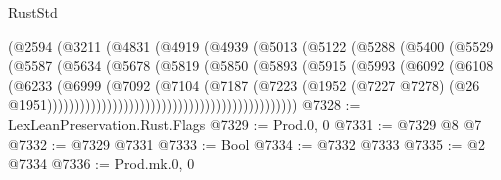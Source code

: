 \begin{lexlean}{RustStd}
\begin{coremodule}
                                        (@2594
                                          (@3211
                                            (@4831
                                              (@4919
                                                (@4939
                                                  (@5013
                                                    (@5122
                                                      (@5288
                                                        (@5400
                                                          (@5529
                                                            (@5587
                                                              (@5634
                                                                (@5678
                                                                  (@5819
                                                                    (@5850
                                                                      (@5893
                                                                        (@5915
                                                                          (@5993
                                                                            (@6092
                                                                              (@6108
                                                                                (@6233
                                                                                  (@6999
                                                                                    (@7092
                                                                                      (@7104
                                                                                        (@7187
                                                                                          (@7223
                                                                                            (@1952
                                                                                              (@7227
                                                                                                @7278)
                                                                                              (@26
                                                                                                @1951))))))))))))))))))))))))))))))))))))))))))))))
@7328 := LexLeanPreservation.Rust.Flags
@7329 := Prod.{0, 0}
@7331 := @7329 @8 @7
@7332 := @7329 @7331
@7333 := Bool
@7334 := @7332 @7333
@7335 := @2 @7334
@7336 := Prod.mk.{0, 0}

\end{coremodule}
\end{lexlean}
